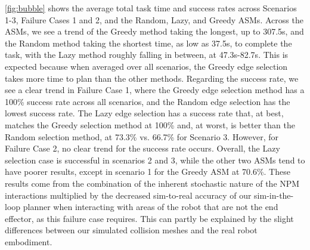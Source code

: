 \cref{fig:bubble} shows the average total task time and success rates across Scenarios 1-3, Failure Cases 1 and 2, and the Random, Lazy, and Greedy ASMs. Across the ASMs, we see a trend of the Greedy method taking the longest, up to 307.5s, and the Random method taking the shortest time, as low as 37.5s, to complete the task, with the Lazy method roughly falling in between, at 47.3s-82.7s. This is expected because when averaged over all scenarios, the Greedy edge selection takes more time to plan than the other methods. Regarding the success rate, we see a clear trend in Failure Case 1, where the Greedy edge selection method has a 100\% success rate across all scenarios, and the Random edge selection has the lowest success rate. The Lazy edge selection has a success rate that, at best, matches the Greedy selection method at 100\% and, at worst, is better than the Random selection method, at 73.3\% vs. 66.7\% for Scenario 3. However, for Failure Case 2, no clear trend for the success rate occurs. Overall, the Lazy selection case is successful in scenarios 2 and 3, while the other two ASMs tend to have poorer results, except in scenario 1 for the Greedy ASM at 70.6\%. These results come from the combination of the inherent stochastic nature of the NPM interactions multiplied by the decreased sim-to-real accuracy of our sim-in-the-loop planner when interacting with areas of the robot that are not the end effector, as this failure case requires. This can partly be explained by the slight differences between our simulated collision meshes and the real robot embodiment.


